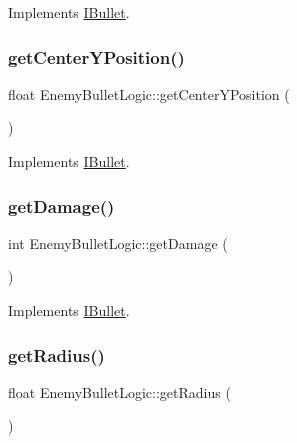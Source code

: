 Implements \hyperlink{class_i_bullet_a43a43e2df81e05a03be42d9025e6dd2a}{I\+Bullet}.

\mbox{\label{class_enemy_bullet_logic_a4c006085f2a11f68e8043bca67d3effe}} 
\subsubsection{\texorpdfstring{get\+Center\+Y\+Position()}{getCenterYPosition()}}
{\footnotesize\ttfamily float Enemy\+Bullet\+Logic\+::get\+Center\+Y\+Position (\begin{DoxyParamCaption}{ }\end{DoxyParamCaption})\hspace{0.3cm}{\ttfamily [virtual]}}



Implements \hyperlink{class_i_bullet_a8245ed2bc72beed1d69547ce5f87a021}{I\+Bullet}.

\mbox{\label{class_enemy_bullet_logic_a08dd084364fc7efc689a7f98e1cee688}} 
\subsubsection{\texorpdfstring{get\+Damage()}{getDamage()}}
{\footnotesize\ttfamily int Enemy\+Bullet\+Logic\+::get\+Damage (\begin{DoxyParamCaption}{ }\end{DoxyParamCaption})\hspace{0.3cm}{\ttfamily [virtual]}}



Implements \hyperlink{class_i_bullet_ab6643a4ad3888ee4ebfbc3d445c4b73d}{I\+Bullet}.

\mbox{\label{class_enemy_bullet_logic_a7e473b13bf07fdf8eb76b65e02879bf7}} 
\subsubsection{\texorpdfstring{get\+Radius()}{getRadius()}}
{\footnotesize\ttfamily float Enemy\+Bullet\+Logic\+::get\+Radius (\begin{DoxyParamCaption}{ }\end{DoxyParamCaption})\hspace{0.3cm}{\ttfamily [virtual]}}



